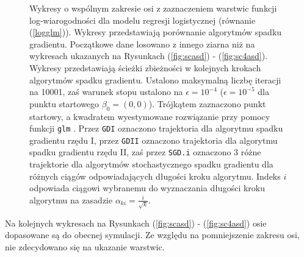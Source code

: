 \begin{figure}[h!]
\begin{center}
\begin{subfigure}[h!]{0.45\textwidth}
            \end{subfigure}
\end{center}
\caption[Porównanie algorytmów spadku gradientu o wspólnym zakresie osi.]{\label{fig:sc5asd} Wykresy o wspólnym zakresie osi z zaznaczeniem warstwic funkcji log-wiarogodności dla modelu regresji logistycznej (równanie (\ref{logglm})). Wykresy przedstawiają porównanie algorytmów spadku gradientu. Początkowe dane losowano z innego ziarna niż na wykresach ukazanych na Rysunkach (\ref{fig:scasd}) - (\ref{fig:sc4asd}). Wykresy przedstawiają ścieżki zbieżności w kolejnych krokach algorytmów spadku gradientu. Ustalono maksymalną liczbę iteracji na 10001, zaś warunek stopu ustalono na $\epsilon=10^{-4}$ ($\epsilon=10^{-5}$ dla punktu startowego $\beta_0 = (0,0)$). Trójkątem zaznaczono punkt startowy, a kwadratem wyestymowane rozwiązanie przy pomocy funkcji \texttt{glm} \cite{glmglm}. Przez \texttt{GDI} oznaczono trajektoria dla algorytmu spadku gradientu rzędu I, przez \texttt{GDII} oznaczono trajektoria dla algorytmu spadku gradientu rzędu II, zaś przez \texttt{SGD.i} oznaczono 3 różne trajektorie dla algorytmów stochastycznego spadku gradientu dla różnych ciągów odpowiadających długości kroku algorytmu. Indeks $i$ odpowiada ciągowi wybranemu do wyznaczania długości kroku algorytmu na zasadzie $\alpha_{ki} = \frac{i}{\sqrt{k}}$.}
\end{figure}

Na kolejnych wykresach na Rysunkach (\ref{fig:scasd}) - (\ref{fig:sc4asd}) osie dopasowane są do obecnej symulacji. Ze względu na pomniejszenie zakresu osi, nie zdecydowano się na ukazanie warstwic.

\newpage

